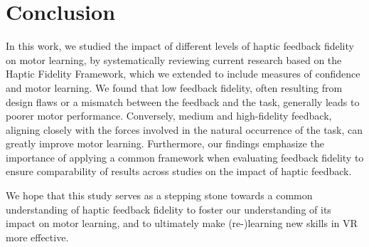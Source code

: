 \section{Conclusion}

In this work, we studied the impact of different levels of haptic feedback fidelity on motor learning, by systematically reviewing current research based on the Haptic Fidelity Framework, which we extended to include measures of confidence and motor learning. 
We found that low feedback fidelity, often resulting from design flaws or a mismatch between the feedback and the task, generally leads to poorer motor performance. Conversely, medium and high-fidelity feedback, aligning closely with the forces involved in the natural occurrence of the task, can greatly improve motor learning. 
Furthermore, our findings emphasize the importance of applying a common framework when evaluating feedback fidelity to ensure comparability of results across studies on the impact of haptic feedback.

We hope that this study serves as a stepping stone towards a common understanding of haptic feedback fidelity to foster our understanding of its impact on motor learning, and to ultimately make (re-)learning new skills in VR more effective. 